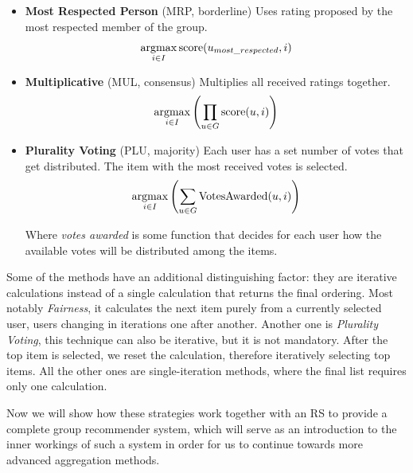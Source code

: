 \begin{itemize}
    \item \textbf{Most Respected Person} (MRP, borderline)\newline
        Uses rating proposed by the most respected member of the group.
        \begin{equation}
            \operatorname*{argmax}_{i \in I}{\textrm{score}(u_{most\_respected},i)}
        \end{equation}
        
        
    \item \textbf{Multiplicative} (MUL, consensus)\newline
        Multiplies all received ratings together.
        \begin{equation}
            \operatorname*{argmax}_{i \in I}{\left(\prod_{u \in G}{\textrm{score}(u,i)}\right)}
        \end{equation}
        
        
    \item \textbf{Plurality Voting} (PLU, majority)\newline
        Each user has a set number of votes that get distributed. The item with the most received votes is selected.
        \begin{equation}
            \operatorname*{argmax}_{i \in I}{\left(\sum_{u \in G}{\textrm{VotesAwarded}(u,i)}\right)}
        \end{equation}
        
        Where \textit{votes awarded} is some function that decides for each user how the available votes will be distributed among the items.
        
\end{itemize}

Some of the methods have an additional distinguishing factor: they are iterative calculations instead of a single calculation that returns the final ordering. Most notably \textit{Fairness}, it calculates the next item purely from a currently selected user, users changing in iterations one after another. Another one is \textit{Plurality Voting}, this technique can also be iterative, but it is not mandatory. After the top item is selected, we reset the calculation, therefore iteratively selecting top items. All the other ones are single-iteration methods, where the final list requires only one calculation.

Now we will show how these strategies work together with an RS to provide a complete group recommender system, which will serve as an introduction to the inner workings of such a system in order for us to continue towards more advanced aggregation methods.

